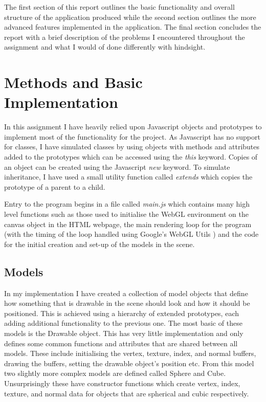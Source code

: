 \documentclass[conference]{IEEEtran}
\begin{document}
The first section of this report outlines the basic functionality and overall structure of the application produced while the second section outlines the more advanced features implemented in the application. The final section concludes the report with a brief description of the problems I encountered throughout the assignment and what I would of done differently with hindsight.

\section{Methods and Basic Implementation}
In this assignment I have heavily relied upon Javascript objects and prototypes to implement most of the functionality for the project. As Javascript has no support for classes, I have simulated classes by using objects with methods and attributes added to the prototypes which can be accessed using the \textit{this} keyword. Copies of an object can be created using the Javascript \textit{new} keyword. To simulate inheritance, I have used a small utility function called \textit{extends} which copies the prototype of a parent to a child.

Entry to the program begins in a file called \textit{main.js} which contains many high level functions such as those used to initialise the WebGL environment on the canvas object in the HTML webpage, the main rendering loop for the program (with the timing of the loop handled using Google's WebGL Utils \cite{webgl-utils}) and the code for the initial creation and set-up of the models in the scene.

\subsection{Models}
In my implementation I have created a collection of model objects that define how something that is drawable in the scene should look and how it should be positioned. This is achieved using a hierarchy of extended prototypes, each adding additional functionality to the previous one. The most basic of these models is the Drawable object. This has very little implementation and only defines some common functions and attributes that are shared between all models. These include initialising the vertex, texture, index, and normal buffers, drawing the buffers, setting the drawable object's position etc. From this model two slightly more complex models are defined called Sphere and Cube. Unsurprisingly these have constructor functions which create vertex, index, texture, and normal data for objects that are spherical and cubic respectively.
\end{document}
